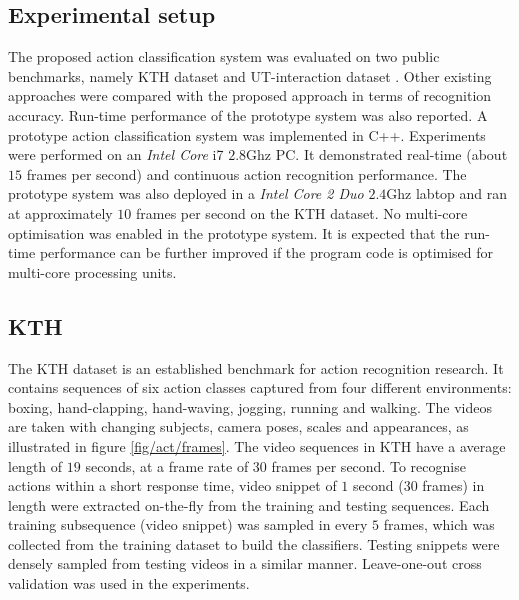 \subsection{Experimental setup} 

The proposed action classification system was evaluated on two public benchmarks, namely KTH dataset \cite{Schuldt2004} and UT-interaction dataset \cite{Ryoo2010}. 
Other existing approaches were compared with the proposed approach in terms of recognition accuracy. 
Run-time performance of the prototype system was also reported. A prototype action classification system was implemented in C++. Experiments were performed on an \emph{Intel Core}\texttrademark \; i7 $2.8$Ghz PC. It demonstrated real-time (about $15$ frames per second) and continuous action recognition performance. 
The prototype system was also deployed in a \emph{Intel Core 2 Duo} $2.4$Ghz labtop and ran at approximately $10$ frames per second on the KTH dataset. 
No multi-core optimisation was enabled in the prototype system. It is expected that the run-time performance can be further improved if the program code is optimised for multi-core processing units.



\subsection{KTH}

The KTH dataset is an established benchmark for action recognition research. 
It contains sequences of six action classes captured from four different environments: boxing, hand-clapping, hand-waving, jogging, running and walking. 
The videos are taken with changing subjects, camera poses, scales and appearances, as illustrated in figure \ref{fig/act/frames}. 
The video sequences in KTH have a average length of $19$ seconds, at a frame rate of $30$ frames per second. 
To recognise actions within a short response time, video snippet of $1$ second ($30$ frames) in length were extracted on-the-fly from the training and testing sequences. 
Each training subsequence (video snippet) was sampled in every $5$ frames, which was collected from the training dataset to build the classifiers. 
Testing snippets were densely sampled from testing videos in a similar manner. 
Leave-one-out cross validation was used in the experiments. 

